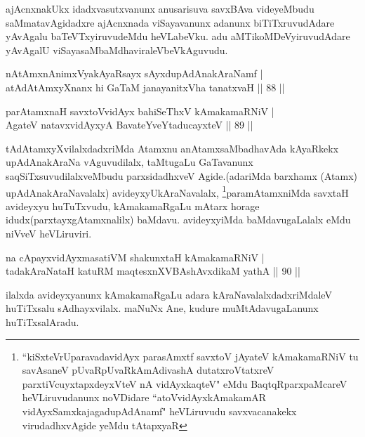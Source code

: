 \begin{artha}
ajAcnxnakUkx idadxvasutxvanunx anusarisuva savxBAva videyeMbudu saMmatavAgidadxre ajAcnxnada viSayavanunx adanunx biTiTxruvudAdare yAvAgalu baTeVTxyiruvudeMdu heVLabeVku. adu aMTikoMDeVyiruvudAdare yAvAgalU viSayasaMbaMdhaviraleVbeVkAguvudu.
\end{artha}


\begin{shl}
nA\s \s tAmx\s nAnimxVyakAyaRsayx sAyxdupAdAnakAraNamf |\\
atAdAtAmxyXnanx hi GaTaM janayanitxVha tanatxvaH \hfill || 88 ||
\end{shl}

\begin{shl}
parAtamxnaH savxtoV\s vidAyx bahiSeThxV kAmakamaRNiV |\\
AgateV natavxvidAyxyA BavateYveYtaducayxteV \hfill || 89 ||
\end{shl}

\begin{artha}
tAdAtamxyXvilalxdadxriMda Atamxnu anAtamxsaMbadhavAda kAyaRkekx upAdAnakAraNa vAguvudilalx, taMtugaLu GaTavanunx saqSiTxsuvudilalxveMbudu parxsidadhxveV Agide.(adariMda barxhamx (Atamx) upAdAnakAraNavalalx) avideyxyUkAraNavalalx, \footnote{``kiSxteVrUparavadavidAyx parasAmxtf savxtoV jAyateV kAmakamaRNiV tu savAsaneV pUvaRpUvaRkAmAdivashA dutatxroVtatxreV parxtiVcuyxtapxdeyxVteV nA vidAyxkaqteV" eMdu BaqtqRparxpaMcareV heVLiruvudanunx noVDidare ``atoVvidAyxkAmakamAR vidAyxSamxkajagadupAdAnamf" heVLiruvudu savxvacanakekx virudadhxvAgide yeMdu tAtapxyaR}paramAtamxniMda savxtaH avideyxyu huTuTxvudu, kAmakamaRgaLu mAtarx horage idudx(parxtayxgAtamxnalilx) baMdavu. avideyxyiMda baMdavugaLalalx eMdu niVveV heVLiruviri.
\end{artha}


\begin{shl}
na cApayxvidAyxmasatiVM shakunxtaH kAmakamaRNiV |\\
tadakAraNataH katuRM maqtesxnXVBAshAvxdikaM yathA \hfill || 90 ||
\end{shl}

\begin{artha}
ilalxda avideyxyanunx kAmakamaRgaLu adara kAraNavalalxdadxriMdaleV huTiTxsalu 
sAdhayxvilalx. maNuNx Ane, kudure muMtAdavugaLanunx huTiTxsalAradu.
\end{artha}


